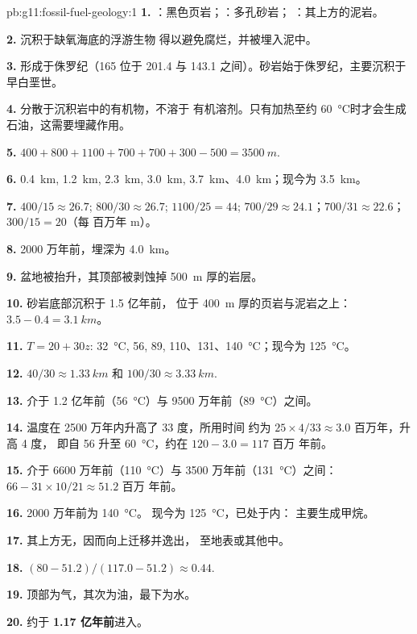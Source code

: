 \begin{solution}{pb:g11:fossil-fuel-geology:1}
\textbf{1.} ：黑色页岩；：多孔砂岩；
：其上方的泥岩。

\textbf{2.} 沉积于缺氧海底的浮游生物
得以避免腐烂，并被埋入泥中。

\textbf{3.} 形成于侏罗纪（165 位于 201.4 与
143.1 之间）。砂岩始于侏罗纪，主要沉积于
早白垩世。

\textbf{4.} 分散于沉积岩中的有机物，不溶于
有机溶剂。只有加热至约
\qty{60}{\degreeCelsius}时才会生成石油，这需要埋藏作用。

\textbf{5.} $400 + 800 + 1100 + 700 + 700 + 300 - 500 = \qty{3500}{m}$.

\textbf{6.} \qty{0.4}{km}, \qty{1.2}{km}, \qty{2.3}{km}, \qty{3.0}{km},
\qty{3.7}{km}、\qty{4.0}{km}；现今为 \qty{3.5}{km}。

\textbf{7.} $400/15 \approx 26.7$; $800/30 \approx 26.7$; $1100/25 = 44$;
$700/29 \approx 24.1$；$700/31 \approx 22.6$；$300/15 = 20$（每
百万年 \unit{m}）。

\textbf{8.} 2000 万年前，埋深为 \qty{4.0}{km}。

\textbf{9.} 盆地被抬升，其顶部被剥蚀掉
\qty{500}{m} 厚的岩层。

\textbf{10.} 砂岩底部沉积于 1.5 亿年前，
位于 \qty{400}{m} 厚的页岩与泥岩之上：$3.5 - 0.4 = \qty{3.1}{km}$。

\textbf{11.} $T = 20 + 30 z$: \qty{32}{\degreeCelsius}, \num{56}, \num{89},
\num{110}、\num{131}、\qty{140}{\degreeCelsius}；现今为
\qty{125}{\degreeCelsius}。

\textbf{12.} $40/30 \approx \qty{1.33}{km}$ 和 $100/30 \approx
\qty{3.33}{km}$.

\textbf{13.} 介于 1.2 亿年前（\qty{56}{\degreeCelsius}）与
9500 万年前（\qty{89}{\degreeCelsius}）之间。

\textbf{14.} 温度在 2500 万年内升高了 33 度，所用时间
约为 $25 \times 4/33 \approx 3.0$ 百万年，升高 4 度，
即自 \num{56} 升至 \qty{60}{\degreeCelsius}，约在 $120 - 3.0 = 117$ 百万
年前。

\textbf{15.} 介于 6600 万年前（\qty{110}{\degreeCelsius}）与
3500 万年前（\qty{131}{\degreeCelsius}）之间：$66 - 31 \times 10/21 \approx 51.2$ 百万
年前。

\textbf{16.} 2000 万年前为 \qty{140}{\degreeCelsius}。
现今为 \qty{125}{\degreeCelsius}，已处于内：
主要生成甲烷。

\textbf{17.} 其上方无，因而向上迁移并逸出，
至地表或其他中。

\textbf{18.} $(80 - 51.2)/(117.0 - 51.2) \approx 0.44$.

\textbf{19.} 顶部为气，其次为油，最下为水。

\textbf{20.} 约于 \textbf{1.17
亿年前}进入。
\end{solution}
